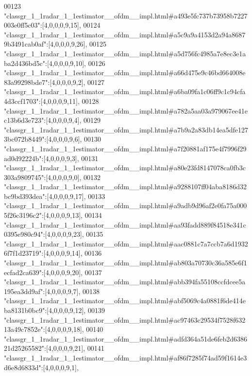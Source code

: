 \begin{DoxyCode}
00123 \textcolor{stringliteral}{"classgr\_1\_1radar\_1\_1estimator\_\_ofdm\_\_impl.html#a493e5fc737b73958b7227003e0ff5c03"}:[4,0,0,0,9,15],
00124 \textcolor{stringliteral}{"classgr\_1\_1radar\_1\_1estimator\_\_ofdm\_\_impl.html#a5c9a9a4153d2a94a86879b3491cab0af"}:[4,0,0,0,9,26],
00125 \textcolor{stringliteral}{"classgr\_1\_1radar\_1\_1estimator\_\_ofdm\_\_impl.html#a5d756fc4985a7e8ec3e1aba2d436bd5c"}:[4,0,0,0,9,10],
00126 \textcolor{stringliteral}{"classgr\_1\_1radar\_1\_1estimator\_\_ofdm\_\_impl.html#a66d475e9c46bd664008e83a99298bde7"}:[4,0,0,0,9,2],
00127 \textcolor{stringliteral}{"classgr\_1\_1radar\_1\_1estimator\_\_ofdm\_\_impl.html#a6ba09fa1c06ff9c1c94cfa4d3ccf1703"}:[4,0,0,0,9,11],
00128 \textcolor{stringliteral}{"classgr\_1\_1radar\_1\_1estimator\_\_ofdm\_\_impl.html#a782a5aa03a979067ee41ec13b6d3e723"}:[4,0,0,0,9,4],
00129 \textcolor{stringliteral}{"classgr\_1\_1radar\_1\_1estimator\_\_ofdm\_\_impl.html#a7b9a2a83db14ea5dfe1273bc072b8449"}:[4,0,0,0,9,6],
00130 \textcolor{stringliteral}{"classgr\_1\_1radar\_1\_1estimator\_\_ofdm\_\_impl.html#a7f20881af175e4f7996f29ad0d92224b"}:[4,0,0,0,9,3],
00131 \textcolor{stringliteral}{"classgr\_1\_1radar\_1\_1estimator\_\_ofdm\_\_impl.html#a80e23fd8147078ca0fb3c303a9809745"}:[4,0,0,0,9,0],
00132 \textcolor{stringliteral}{"classgr\_1\_1radar\_1\_1estimator\_\_ofdm\_\_impl.html#a9288107ff04aba8186d32bc9bd393dea"}:[4,0,0,0,9,17],
00133 \textcolor{stringliteral}{"classgr\_1\_1radar\_1\_1estimator\_\_ofdm\_\_impl.html#a9adb9d96af2e0fa75a0005f26c3196c2"}:[4,0,0,0,9,13],
00134 \textcolor{stringliteral}{"classgr\_1\_1radar\_1\_1estimator\_\_ofdm\_\_impl.html#aa93fadd889f84518e341c0395e980c94"}:[4,0,0,0,9,23],
00135 \textcolor{stringliteral}{"classgr\_1\_1radar\_1\_1estimator\_\_ofdm\_\_impl.html#aac0881c7a7ccb7a6d19326f7f1d23719"}:[4,0,0,0,9,14],
00136 \textcolor{stringliteral}{"classgr\_1\_1radar\_1\_1estimator\_\_ofdm\_\_impl.html#ab803a70730c36a585e6f1ecfad2ca639"}:[4,0,0,0,9,20],
00137 \textcolor{stringliteral}{"classgr\_1\_1radar\_1\_1estimator\_\_ofdm\_\_impl.html#abb394fa55108ccfdcee5a195ea3dd9af"}:[4,0,0,0,9,7],
00138 \textcolor{stringliteral}{"classgr\_1\_1radar\_1\_1estimator\_\_ofdm\_\_impl.html#abf5069c4a0881f6de414eba8131b0bc9"}:[4,0,0,0,9,12],
00139 \textcolor{stringliteral}{"classgr\_1\_1radar\_1\_1estimator\_\_ofdm\_\_impl.html#ac97463c29534f7528f63213a49c7852e"}:[4,0,0,0,9,18],
00140 \textcolor{stringliteral}{"classgr\_1\_1radar\_1\_1estimator\_\_ofdm\_\_impl.html#adfd364a51de6feb2d638621d25265582"}:[4,0,0,0,9,21],
00141 \textcolor{stringliteral}{"classgr\_1\_1radar\_1\_1estimator\_\_ofdm\_\_impl.html#af86f7285f74ad59f1614e3d6e8d6833d"}:[4,0,0,0,9,1],

\end{DoxyCode}
